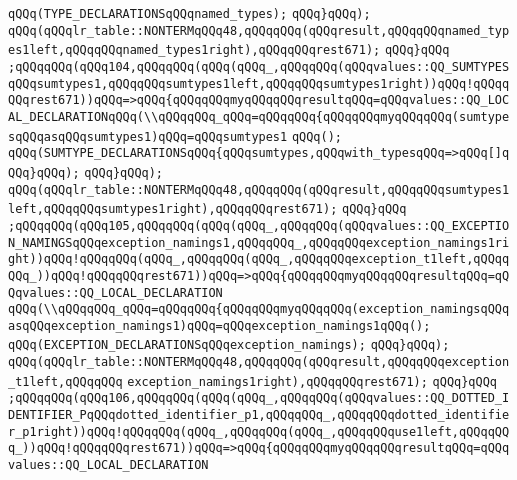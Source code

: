 \verb|qQQq(TYPE_DECLARATIONSqQQqnamed_types);|\newline
\verb|qQQq}qQQq);|\newline
\verb|qQQq(qQQqlr_table::NONTERMqQQq48,qQQqqQQq(qQQqresult,qQQqqQQqnamed_types1left,qQQqqQQqnamed_types1right),qQQqqQQqrest671);|\newline
\verb|qQQq}qQQq|\newline
\verb|;qQQqqQQq(qQQq104,qQQqqQQq(qQQq(qQQq_,qQQqqQQq(qQQqvalues::QQ_SUMTYPESqQQqsumtypes1,qQQqqQQqsumtypes1left,qQQqqQQqsumtypes1right))qQQq!qQQqqQQqrest671))qQQq=>qQQq{qQQqqQQqmyqQQqqQQqresultqQQq=qQQqvalues::QQ_LOCAL_DECLARATIONqQQq(\\qQQqqQQq_qQQq=qQQqqQQq{qQQqqQQqmyqQQqqQQq(sumtypesqQQqasqQQqsumtypes1)qQQq=qQQqsumtypes1|\newline
\verb|qQQq();|\newline
\verb|qQQq(SUMTYPE_DECLARATIONSqQQq{qQQqsumtypes,qQQqwith_typesqQQq=>qQQq[]qQQq}qQQq);|\newline
\verb|qQQq}qQQq);|\newline
\verb|qQQq(qQQqlr_table::NONTERMqQQq48,qQQqqQQq(qQQqresult,qQQqqQQqsumtypes1left,qQQqqQQqsumtypes1right),qQQqqQQqrest671);|\newline
\verb|qQQq}qQQq|\newline
\verb|;qQQqqQQq(qQQq105,qQQqqQQq(qQQq(qQQq_,qQQqqQQq(qQQqvalues::QQ_EXCEPTION_NAMINGSqQQqexception_namings1,qQQqqQQq_,qQQqqQQqexception_namings1right))qQQq!qQQqqQQq(qQQq_,qQQqqQQq(qQQq_,qQQqqQQqexception_t1left,qQQqqQQq_))qQQq!qQQqqQQqrest671))qQQq=>qQQq{qQQqqQQqmyqQQqqQQqresultqQQq=qQQqvalues::QQ_LOCAL_DECLARATION|\newline
\verb|qQQq(\\qQQqqQQq_qQQq=qQQqqQQq{qQQqqQQqmyqQQqqQQq(exception_namingsqQQqasqQQqexception_namings1)qQQq=qQQqexception_namings1qQQq();|\newline
\verb|qQQq(EXCEPTION_DECLARATIONSqQQqexception_namings);|\newline
\verb|qQQq}qQQq);|\newline
\verb|qQQq(qQQqlr_table::NONTERMqQQq48,qQQqqQQq(qQQqresult,qQQqqQQqexception_t1left,qQQqqQQq|\newline
\verb|exception_namings1right),qQQqqQQqrest671);|\newline
\verb|qQQq}qQQq|\newline
\verb|;qQQqqQQq(qQQq106,qQQqqQQq(qQQq(qQQq_,qQQqqQQq(qQQqvalues::QQ_DOTTED_IDENTIFIER_PqQQqdotted_identifier_p1,qQQqqQQq_,qQQqqQQqdotted_identifier_p1right))qQQq!qQQqqQQq(qQQq_,qQQqqQQq(qQQq_,qQQqqQQquse1left,qQQqqQQq_))qQQq!qQQqqQQqrest671))qQQq=>qQQq{qQQqqQQqmyqQQqqQQqresultqQQq=qQQqvalues::QQ_LOCAL_DECLARATION|\newline
